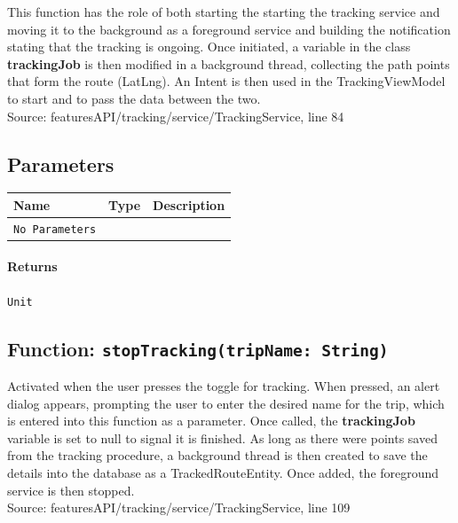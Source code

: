 \documentclass{article}
\begin{document}
                This function has the role of both starting the starting the tracking service
                and moving it to the background as a foreground service and building the notification
                stating that the tracking is ongoing. Once initiated, a variable in the class 
                \textbf{trackingJob} is then modified in a background thread, collecting the path 
                points that form the route (LatLng). An Intent is then used in the TrackingViewModel
                to start and to pass the data between the two. \\
                Source: featuresAPI/tracking/service/TrackingService, line 84

                \subsection*{Parameters}

                \begin{tabular}{p{3cm} p{4cm} p{7cm}}
                \toprule
                \textbf{Name} & \textbf{Type} & \textbf{Description} \\ \midrule
                \texttt{No Parameters} &
                \end{tabular}

                \paragraph{Returns} \texttt{Unit}

            \newpage

            \subsection*{Function: \texttt{stopTracking(tripName: String)}}

                Activated when the user presses the toggle for tracking. When pressed,
                an alert dialog appears, prompting the user to enter the desired name for
                the trip, which is entered into this function as a parameter. Once called,
                the \textbf{trackingJob} variable is set to null to signal it is finished. 
                As long as there were points saved from the tracking procedure, a background 
                thread is then created to save the details into the database as a 
                TrackedRouteEntity. Once added, the foreground service is then stopped. \\
                Source: featuresAPI/tracking/service/TrackingService, line 109
\end{document}
